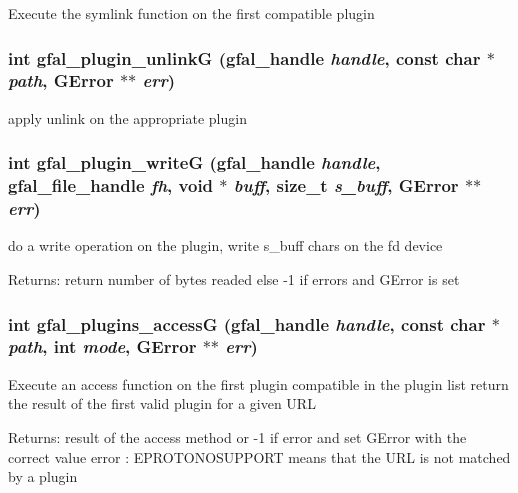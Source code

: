 Execute the symlink function on the first compatible plugin 
\subsubsection{\setlength{\rightskip}{0pt plus 5cm}int gfal\_\-plugin\_\-unlink\-G (gfal\_\-handle {\em handle}, const char $\ast$ {\em path}, GError $\ast$$\ast$ {\em err})}\label{gfal__common__plugin_8c_1a4632c68c7d81f87071733081900dee}


apply unlink on the appropriate plugin 
\subsubsection{\setlength{\rightskip}{0pt plus 5cm}int gfal\_\-plugin\_\-write\-G (gfal\_\-handle {\em handle}, gfal\_\-file\_\-handle {\em fh}, void $\ast$ {\em buff}, size\_\-t {\em s\_\-buff}, GError $\ast$$\ast$ {\em err})}\label{gfal__common__plugin_8c_caaf6298a84f453bb6ddd50c36b6dfd7}


do a write operation on the plugin, write s\_\-buff chars on the fd device \begin{Desc}
\item[Returns:]return number of bytes readed else -1 if errors and GError is set \end{Desc}
\subsubsection{\setlength{\rightskip}{0pt plus 5cm}int gfal\_\-plugins\_\-access\-G (gfal\_\-handle {\em handle}, const char $\ast$ {\em path}, int {\em mode}, GError $\ast$$\ast$ {\em err})}\label{gfal__common__plugin_8c_b59f407ec7865163a60faaa56cbae432}


Execute an access function on the first plugin compatible in the plugin list return the result of the first valid plugin for a given URL \begin{Desc}
\item[Returns:]result of the access method or -1 if error and set GError with the correct value error : EPROTONOSUPPORT means that the URL is not matched by a plugin \end{Desc}
